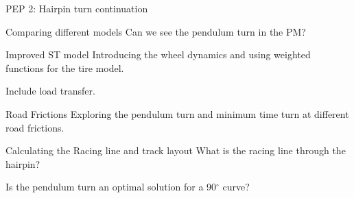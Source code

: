 \begin{frame}{PEP 2: Hairpin turn continuation}
    \begin{alertblock}{Comparing different models}
        Can we see the pendulum turn in the PM?
    \end{alertblock}

    \begin{alertblock}{Improved ST model}
        Introducing the wheel dynamics and using weighted functions for the tire model. 

        Include load transfer.
    \end{alertblock}

    \begin{alertblock}{Road Frictions}
        Exploring the pendulum turn and minimum time turn at different road frictions.
    \end{alertblock}

    \begin{alertblock}{Calculating the Racing line and track layout}
        What is the racing line through the hairpin? 

        Is the pendulum turn an optimal solution for a 90$^\circ$ curve?
    \end{alertblock}

\end{frame}